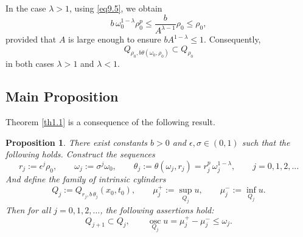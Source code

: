 \documentclass[a4paper,11pt,fullpage]{article}
\DeclareMathOperator*{\osc}{osc}
\numberwithin{equation}{section}
\newtheorem{propo}{Proposition}[section]
\begin{document}
\vskip0.2cm \noindent 
In the case $\lambda>1$, using \eqref{eq9.5}, we obtain
\begin{equation*}
b\,\omega_0^{1-\lambda}\rho_0^p\leqslant \frac{b}{A^{\lambda-1}}\rho_0\leqslant \rho_0,
\end{equation*}
provided that $A$ is large enough to ensure $bA^{1-\lambda}\leqslant1$.
Consequently,
$$Q_{\rho_0, b\theta(\omega_0, \rho_0)}\subset Q_{\rho_0}$$
in both cases $\lambda>1$ and $\lambda<1$.


\subsection{Main Proposition}


Theorem \ref{th1.1} is a consequence of the following result.

\begin{propo}\label{pr9.1}
There exist constants $b>0$ and $\epsilon,\sigma\in(0,1)$ such that the following
holds.
Construct the sequences
\begin{equation*}
r_j:=\epsilon^{j} \rho_0, \qquad\omega_j:=\sigma^j \omega_0, \qquad\theta_j:=\theta(\omega_j, r_j)=r^{p}_j\,\omega^{1-\lambda}_j, \qquad j=0, 1, 2, ...
\end{equation*}
And define the family of intrinsic cylinders 
\begin{equation*}
Q_j:=Q_{r_{j}, b\,\theta_{j}}(x_0,t_0), \qquad \mu^+_j:=\sup\limits_{Q_j}u, \qquad \mu^-_j:=\inf\limits_{Q_j} u.
\end{equation*}
Then for all $j=0,1,2,\ldots$, the following assertions hold:
\begin{equation}\label{eq9.11}
Q_{j+1}\subset Q_{j},\qquad
\osc\limits_{Q_{j}} u=\mu^+_j-\mu^-_j\leqslant \omega_j.
\end{equation}
\end{propo}
\end{document}
